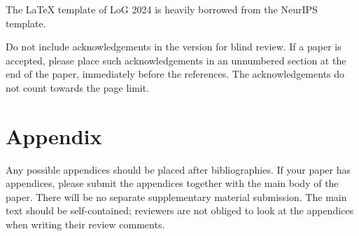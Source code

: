 \documentclass{article}
\begin{document}
The \LaTeX{} template of LoG 2024 is heavily borrowed from the NeurIPS template.

Do not include acknowledgements in the version for blind review.
If a paper is accepted, please place such acknowledgements in an unnumbered section at the end of the paper, immediately before the references.
The acknowledgements do not count towards the page limit.




\appendix
\section{Appendix}
Any possible appendices should be placed after bibliographies.
If your paper has appendices, please submit the appendices together with the main body of the paper.
There will be no separate supplementary material submission.
The main text should be self-contained; reviewers are not obliged to look at the appendices when writing their review comments.
\end{document}
